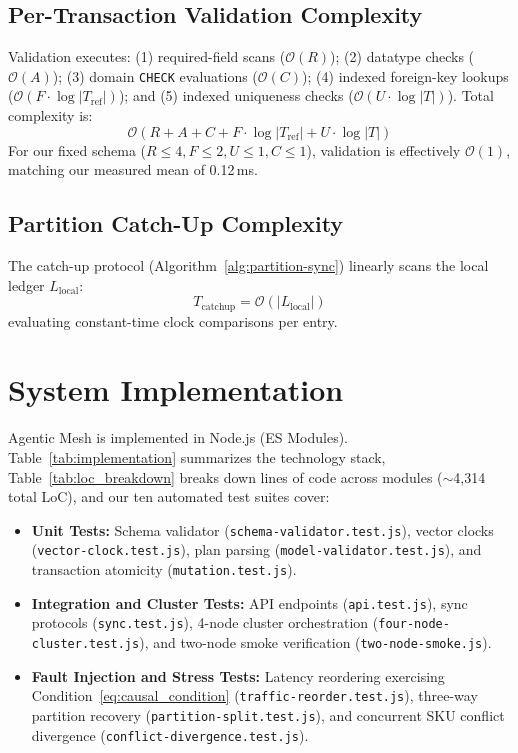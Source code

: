 \subsection{Per-Transaction Validation Complexity}
Validation executes: (1) required-field scans ($\mathcal{O}(R)$); (2) datatype checks ($\mathcal{O}(A)$); (3) domain \texttt{CHECK} evaluations ($\mathcal{O}(C)$); (4) indexed foreign-key lookups ($\mathcal{O}(F \cdot \log |T_{\text{ref}}|)$); and (5) indexed uniqueness checks ($\mathcal{O}(U \cdot \log |T|)$). Total complexity is:
\[
\mathcal{O}(R + A + C + F \cdot \log |T_{\text{ref}}| + U \cdot \log |T|)
\]
For our fixed schema ($R \le 4, F \le 2, U \le 1, C \le 1$), validation is effectively $\mathcal{O}(1)$, matching our measured mean of 0.12\,ms.

\subsection{Partition Catch-Up Complexity}
The catch-up protocol (Algorithm~\ref{alg:partition-sync}) linearly scans the local ledger $L_{\text{local}}$:
\[
T_{\text{catchup}} = \mathcal{O}(|L_{\text{local}}|)
\]
evaluating constant-time clock comparisons per entry.

\section{System Implementation}
\label{sec:implementation}

Agentic Mesh is implemented in Node.js (ES Modules). Table~\ref{tab:implementation} summarizes the technology stack, Table~\ref{tab:loc_breakdown} breaks down lines of code across modules ($\sim$4{,}314 total LoC), and our ten automated test suites cover:
\begin{itemize}
    \item \textbf{Unit Tests:} Schema validator (\texttt{schema-validator.test.js}), vector clocks (\texttt{vector-clock.test.js}), plan parsing (\texttt{model-validator.test.js}), and transaction atomicity (\texttt{mutation.test.js}).
    \item \textbf{Integration and Cluster Tests:} API endpoints (\texttt{api.test.js}), sync protocols (\texttt{sync.test.js}), 4-node cluster orchestration (\texttt{four-node-cluster.test.js}), and two-node smoke verification (\texttt{two-node-smoke.js}).
    \item \textbf{Fault Injection and Stress Tests:} Latency reordering exercising Condition~\eqref{eq:causal_condition} (\texttt{traffic-reorder.test.js}), three-way partition recovery (\texttt{partition-split.test.js}), and concurrent SKU conflict divergence (\texttt{conflict-divergence.test.js}).
\end{itemize}

